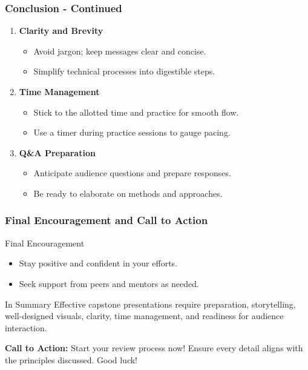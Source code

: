 \documentclass[aspectratio=169]{beamer}
\begin{document}
\begin{frame}[fragile]
    \frametitle{Conclusion - Continued}
    \begin{enumerate}[resume]
        \item \textbf{Clarity and Brevity}
        \begin{itemize}
            \item Avoid jargon; keep messages clear and concise.
            \item Simplify technical processes into digestible steps.
        \end{itemize}
        
        \item \textbf{Time Management}
        \begin{itemize}
            \item Stick to the allotted time and practice for smooth flow.
            \item Use a timer during practice sessions to gauge pacing.
        \end{itemize}
        
        \item \textbf{Q\&A Preparation}
        \begin{itemize}
            \item Anticipate audience questions and prepare responses.
            \item Be ready to elaborate on methods and approaches.
        \end{itemize}
    \end{enumerate}
\end{frame}

\begin{frame}[fragile]
    \frametitle{Final Encouragement and Call to Action}
    \begin{block}{Final Encouragement}
        \begin{itemize}
            \item Stay positive and confident in your efforts.
            \item Seek support from peers and mentors as needed.
        \end{itemize}
    \end{block}

    \begin{block}{In Summary}
        Effective capstone presentations require preparation, storytelling, well-designed visuals, clarity, time management, and readiness for audience interaction.
    \end{block}

    \textbf{Call to Action:} Start your review process now! Ensure every detail aligns with the principles discussed. Good luck!
\end{frame}
\end{document}
